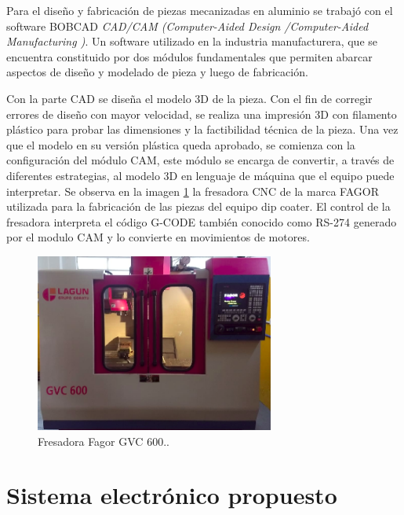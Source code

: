 Para el diseño y fabricación de piezas mecanizadas en aluminio se trabajó con el software BOBCAD \citep{web_bobcad} \textit{CAD/CAM (Computer-Aided Design /Computer-Aided Manufacturing )}. Un software  utilizado en la industria manufacturera, que se encuentra constituido por dos módulos fundamentales que permiten abarcar aspectos de diseño y modelado de pieza y luego de fabricación.  

Con la parte CAD se diseña el modelo 3D de la pieza. Con el fin de corregir errores de diseño con mayor velocidad, se realiza una impresión 3D con filamento plástico para probar las dimensiones y la factibilidad técnica de la pieza.
Una vez que el modelo en su versión plástica queda aprobado, se comienza con la configuración del módulo CAM, este módulo se encarga de convertir, a través de diferentes estrategias, al modelo 3D en lenguaje de máquina que el equipo puede interpretar. Se observa en la imagen \ref{fig:fagor} la fresadora CNC de la marca FAGOR \citep{web_fagor} utilizada para la fabricación de las piezas del equipo dip coater. El control de la fresadora interpreta el código G-CODE también conocido como RS-274 \citep{web_gcode} generado por el modulo CAM y lo convierte en movimientos de motores.


\begin{figure}[ht]
\centering 
\includegraphics[width=0.7\textwidth]{./Figures/fagor.png}
\caption{Fresadora Fagor GVC 600.\protect\footnotemark.}
\label{fig:fagor}
\end{figure}
 

\section{Sistema electrónico propuesto}
\label{sec:sistema_propuesto}


